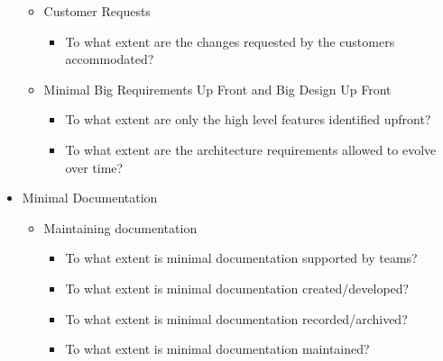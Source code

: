 \begin{itemize}
\begin{itemize}
\begin{itemize}
				\end{itemize}
			\item Customer Requests
				\begin{itemize}
					\item To what extent are the changes requested by the customers accommodated?
				\end{itemize}
			\item Minimal Big Requirements Up Front and Big Design Up Front
				\begin{itemize}
					\item To what extent are only the high level features identified upfront?
					\item To what extent are the architecture requirements allowed to evolve over time?
				\end{itemize}
		\end{itemize}
	\item Minimal Documentation
		\begin{itemize}
			\item Maintaining documentation 
				\begin{itemize}
					\item To what extent is minimal documentation supported by teams?
					\item To what extent is minimal documentation created/developed?
					\item To what extent is minimal documentation recorded/archived?
					\item To what extent is minimal documentation maintained?
				\end{itemize}
		\end{itemize}
\end{itemize}
